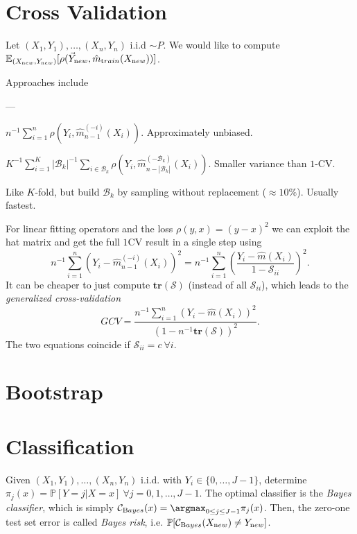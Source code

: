 \section{Cross Validation}\label{sec:cross-validation}
Let $(X_{1}, Y_{1}), \dots, (X_{n}, Y_{n})$ i.i.d $\sim P$.
We would like to compute $\mathbb{E}_{(X_{\textrm new}, Y_{\textrm new})}[\rho(\vec{Y}_{\textrm new}, \hat{m}_{\textrm train} (X_{\textrm new}))]$.
\begin{sectionbox}\nospacing{}
  Approaches include
  \begin{description}[topsep=0pt,itemsep=-1ex,partopsep=1ex,parsep=1ex]
    \item[Validation set:] ---
    \item[Leave-one-out CV:] $n^{-1}\sum_{i=1}^{n}\rho\left(Y_{i}, \hat{m}_{n-1}^{(-i)}(X_{i})\right)$. Approximately unbiased.
    \item[$K$-fold CV:] $K^{-1}\sum_{i=1}^{K}|\mathcal{B}_{k}|^{-1}\sum_{i\in\mathcal{B}_{k}}\rho\left(Y_{i}, \hat{m}_{n-|\mathcal{B}_{k}|}^{(-\mathcal{B}_{k})}(X_{i})\right)$. Smaller variance than $1$-CV.
    \item[Random division:] Like $K$-fold, but build $\mathcal{B}_{k}$ by sampling without replacement ($\approx 10\%$). Usually fastest.
  \end{description}
\end{sectionbox}
\begin{sectionbox}\nospacing{}
  For linear fitting operators and the loss $\rho(y, x) = (y-x)^{2}$ we can exploit the hat matrix and get the full $1$CV result in a single step using
  \[
    n^{-1}\sum_{i=1}^{n}\left(Y_{i}-\hat{m}_{n-1}^{(-i)}(X_{i})\right)^{2} = n^{-1}\sum_{i=1}^{n}\left(\frac{Y_{i}-\hat{m}(X_{i})}{1-\mathcal{S}_{ii}}\right)^{2}.
  \]
  It can be cheaper to just compute $\mathbf{tr}(\mathcal{S})$ (instead of all $\mathcal{S}_{ii}$), which leads to the \emph{generalized cross-validation}
  \[
    GCV = \frac{n^{-1}\sum_{i=1}^{n}(Y_{i}-\hat{m}(X_{i}))^{2}}{(1-n^{-1}\mathbf{tr}(\mathcal{S}))^{2}}.
  \]
  The two equations coincide if $\mathcal{S}_{ii}=c\ \forall i$.
\end{sectionbox}

\section{Bootstrap}\label{sec:bootstrap}

\section{Classification}\label{sec:classification}
Given $(X_1, Y_1), \dots, (X_n,Y_n)$ i.i.d. with $Y_i \in \{0, \dots, J-1\}$, determine $\pi_j(x) = \mathbb{P}[Y=j|X=x]\ \forall j = 0,1,\dots,J-1$.
The optimal classifier is the \emph{Bayes classifier}, which is simply $\mathcal{C}_{\textrm Bayes}(x) = \argmax_{0\leq j\leq J-1}\pi_j(x)$.
Then, the zero-one test set error is called \emph{Bayes risk}, i.e. $\mathbb{P}[\mathcal{C}_{\textrm Bayes}(X_{\textrm new}) \neq Y_{\textrm new}]$.

